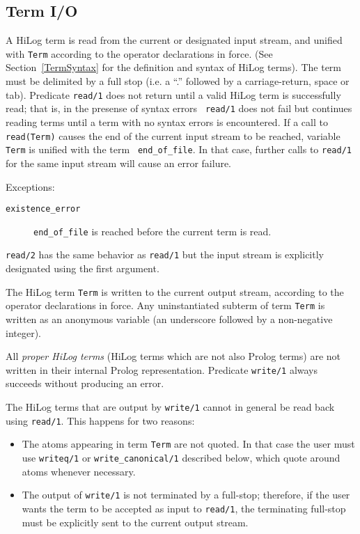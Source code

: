 \subsection{Term I/O}
\begin{description}
    A HiLog term is read from the current or designated input stream,
    and unified with {\tt Term} according to the operator declarations
    in force.  (See Section~\ref{TermSyntax} for the definition and
    syntax of HiLog terms). The term must be delimited by a full stop
    (i.e. a ``.'' followed by a carriage-return, space or tab).
    Predicate {\tt read/1} does not return until a valid HiLog term is
    successfully read; that is, in the presense of syntax errors {\tt
    read/1} does not fail but continues reading terms until a term
    with no syntax errors is encountered.  If a call to {\tt
    read(Term)} causes the end of the current input stream to be
    reached, variable {\tt Term} is unified with the term {\tt
    end\_of\_file}.  In that case, further calls to {\tt read/1} for
    the same input stream will cause an error failure.

    Exceptions:
    \begin{description}
    \item[{\tt existence\_error}]
	{\tt end\_of\_file} is reached before the current term is read.
    \end{description}

	{\tt read/2} has the same behavior as {\tt read/1} but the
	input stream is explicitly designated using the first argument.

    The HiLog term {\tt Term} is written to the current output stream, 
    according to the operator declarations in force.  Any uninstantiated 
    subterm of term {\tt Term} is written as an anonymous variable (an 
    underscore followed by a non-negative integer).  

    All {\em proper HiLog terms} (HiLog terms which are not also Prolog terms) 
    are not written in their internal Prolog representation.  Predicate 
    {\tt write/1} always succeeds without producing an error.

    The HiLog terms that are output by {\tt write/1} cannot in general be 
    read back using {\tt read/1}.  This happens for two reasons:
    \begin{itemize}
    \item The atoms appearing in term {\tt Term} are not quoted. In that case 
          the user must use {\tt writeq/1} or 
          {\tt write\_canonical/1} described below, which quote around atoms 
          whenever necessary.
    \item The output of {\tt write/1} is not terminated by a full-stop;
          therefore, if the user wants the term to be accepted as input to
          {\tt read/1}, the terminating full-stop must be explicitly sent 
          to the current output stream. 
    \end{itemize}


\end{description}
